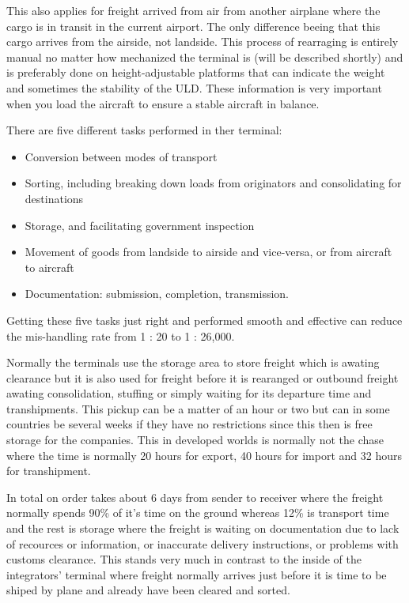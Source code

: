 This also applies for freight arrived from air from another airplane where the cargo is in transit in the current airport. The only difference beeing that this cargo arrives from the airside, not landside.
This process of rearraging is entirely manual no matter how mechanized the terminal is (will be described shortly) and is preferably done on height-adjustable platforms that can indicate the weight and sometimes the stability of the ULD. These information is very important when you load the aircraft to ensure a stable aircraft in balance.


There are five different tasks performed in ther terminal:
\begin{itemize}
\item Conversion between modes of transport
\item Sorting, including breaking down loads from originators and consolidating for destinations
\item Storage, and facilitating government inspection
\item Movement of goods from landside to airside and vice-versa, or from aircraft to aircraft
\item Documentation: submission, completion, transmission.
\end{itemize}

Getting these five tasks just right and performed smooth and effective can reduce the mis-handling rate from 1 : 20 to 1 : 26,000.

Normally the terminals use the storage area to store freight which is awating clearance but it is also used for freight before it is rearanged or outbound freight awating consolidation, stuffing or simply waiting for its departure time and transhipments. This pickup can be a matter of an hour or two but can in some countries be several weeks if they have no restrictions since this then is free storage for the companies. This in developed worlds is normally not the chase where the time is normally 20 hours for export, 40 hours for import and 32 hours for transhipment.

In total on order takes about 6 days from sender to receiver where the freight normally spends 90\% of it's time on the ground whereas 12\% is transport time and the rest is storage where the freight is waiting on documentation due to lack of recources or information, or inaccurate delivery instructions, or problems with customs clearance. This stands very much in contrast to the inside of the integrators' terminal where freight normally arrives just before it is time to be shiped by plane and already have been cleared and sorted.

